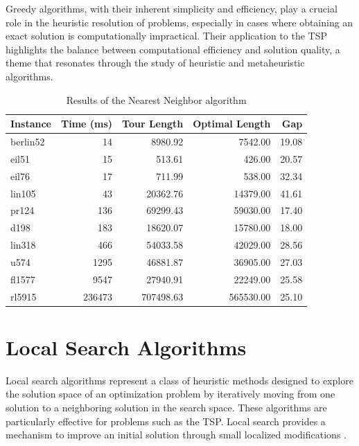 Greedy algorithms, with their inherent simplicity and efficiency, play a crucial role in the heuristic resolution of problems, especially in cases where obtaining an exact solution is computationally impractical. Their application to the \Gls{TSP} highlights the balance between computational efficiency and solution quality, a theme that resonates through the study of heuristic and metaheuristic algorithms.


\begin{table}
	\centering
	\caption{Results of the Nearest Neighbor algorithm}
	\begin{tabular}{lrrrr}
		\toprule
		Instance  & Time (ms) & Tour Length & Optimal Length & Gap   \\
		\midrule
		berlin52 & 14         & 8980.92        & 7542.00          & 19.08 \\
		eil51    & 15         & 513.61         & 426.00           & 20.57 \\
		eil76    & 17         & 711.99         & 538.00           & 32.34 \\
		lin105   & 43         & 20362.76       & 14379.00         & 41.61 \\
		pr124    & 136        & 69299.43       & 59030.00         & 17.40 \\
		d198     & 183        & 18620.07       & 15780.00         & 18.00 \\
		lin318   & 466        & 54033.58       & 42029.00         & 28.56 \\
		u574     & 1295       & 46881.87       & 36905.00         & 27.03 \\
		fl1577   & 9547       & 27940.91       & 22249.00         & 25.58 \\
		rl5915   & 236473     & 707498.63      & 565530.00        & 25.10 \\
		\bottomrule
	\end{tabular}
\end{table}


\section{Local Search Algorithms}

Local search algorithms represent a class of heuristic methods designed to explore the solution space of an optimization problem by iteratively moving from one solution to a neighboring solution in the search space. These algorithms are particularly effective for problems such as the \Gls{TSP}. Local search provides a mechanism to improve an initial solution through small localized modifications \cite{Johnson2002,Lawler1985}.

